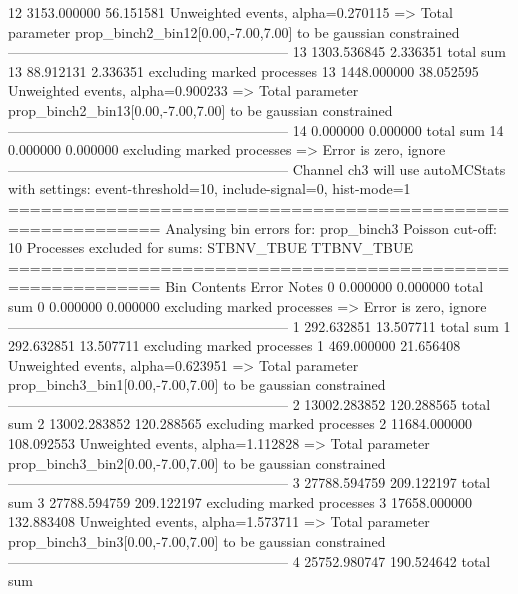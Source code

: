 12         3153.000000     56.151581       Unweighted events, alpha=0.270115
  => Total parameter prop_binch2_bin12[0.00,-7.00,7.00] to be gaussian constrained
------------------------------------------------------------
13         1303.536845     2.336351        total sum                     
13         88.912131       2.336351        excluding marked processes    
13         1448.000000     38.052595       Unweighted events, alpha=0.900233
  => Total parameter prop_binch2_bin13[0.00,-7.00,7.00] to be gaussian constrained
------------------------------------------------------------
14         0.000000        0.000000        total sum                     
14         0.000000        0.000000        excluding marked processes    
  => Error is zero, ignore      
------------------------------------------------------------
Channel ch3 will use autoMCStats with settings: event-threshold=10, include-signal=0, hist-mode=1
============================================================
Analysing bin errors for: prop_binch3
Poisson cut-off: 10
Processes excluded for sums: STBNV_TBUE TTBNV_TBUE
============================================================
Bin        Contents        Error           Notes                         
0          0.000000        0.000000        total sum                     
0          0.000000        0.000000        excluding marked processes    
  => Error is zero, ignore      
------------------------------------------------------------
1          292.632851      13.507711       total sum                     
1          292.632851      13.507711       excluding marked processes    
1          469.000000      21.656408       Unweighted events, alpha=0.623951
  => Total parameter prop_binch3_bin1[0.00,-7.00,7.00] to be gaussian constrained
------------------------------------------------------------
2          13002.283852    120.288565      total sum                     
2          13002.283852    120.288565      excluding marked processes    
2          11684.000000    108.092553      Unweighted events, alpha=1.112828
  => Total parameter prop_binch3_bin2[0.00,-7.00,7.00] to be gaussian constrained
------------------------------------------------------------
3          27788.594759    209.122197      total sum                     
3          27788.594759    209.122197      excluding marked processes    
3          17658.000000    132.883408      Unweighted events, alpha=1.573711
  => Total parameter prop_binch3_bin3[0.00,-7.00,7.00] to be gaussian constrained
------------------------------------------------------------
4          25752.980747    190.524642      total sum                     
